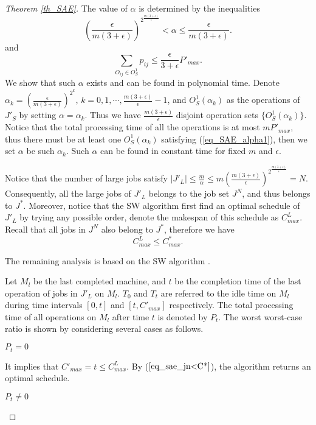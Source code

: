 \documentclass{llncs}
\newcommand{\be}{\begin{equation}}
\newcommand{\ee}{\end{equation}}
\numberwithin{subcase}{case}
\begin{document}
\begin{proof}[Theorem \ref{th_SAE}]
The value of $\alpha$ is determined by the inequalities
\be
\left(\frac{\epsilon}{m(3+\epsilon)}\right)^{2^{\frac{m(3+\epsilon)}{\epsilon}}} < \alpha \leq \frac{\epsilon}{m(3+\epsilon)}. \label{eq_SAE_alpha2}
\ee
and
\be
\sum_{O_{ij}\in O^1_S} p_{ij} \leq \frac{\epsilon}{3 + \epsilon} P'_{max}. \label{eq_SAE_alpha1}
\ee
We show that such $\alpha$ exists and can be found in polynomial time. Denote $\alpha_k = \left(\frac{\epsilon}{m(3+\epsilon)}\right)^{2^{k}}$, $k = 0, 1, \cdots, \frac{m(3+\epsilon)}{\epsilon}-1$, and $O^1_S(\alpha_k)$ as the operations of $J'_S$ by setting $\alpha = \alpha_k$. Thus we have $\frac{m(3+\epsilon)}{\epsilon}$ disjoint operation sets $\{O^1_S(\alpha_k)\}$. Notice that the total processing time of all the operations is at most $mP'_{max}$, thus there must be at least one $O^1_S(\alpha_k)$ satisfying (\ref{eq_SAE_alpha1}), then we set $\alpha$ be such $\alpha_k$. Such $\alpha$ can be found in constant time for fixed $m$ and $\epsilon$.

Notice that the number of large jobs satisfy $|J'_L| \leq \frac{m}{\alpha} \leq m\left(\frac{m(3+\epsilon)}{\epsilon}\right)^{2^{\frac{m(3+\epsilon)}{\epsilon}}}  = N$. Consequently, all the large jobs of $J'_L$ belongs to the job set $J^N$, and thus belongs to $J^*$. Moreover, notice that the SW algorithm first find an optimal schedule of $J'_L$ by trying any possible order, denote the makespan of this schedule as $C^L_{max}$. Recall that all jobs in $J^N$ also belong to $J^*$, therefore we have
\be
C^L_{max} \leq C^*_{max}. \label{eq_sae_jn<C*}
\ee

The remaining analysis is based on the SW algorithm \cite{Sevastianov1998}.

Let $M_l$ be the last completed machine, and $t$ be the completion time of the last operation of jobs in $J'_L$ on $M_l$. $T_0$ and $T_t$ are referred to the idle time on $M_l$ during time intervals $[0, t]$ and $[t, C'_{max}]$ respectively. The total processing time of all operations on $M_l$ after time $t$ is denoted by $P_t$. The worst worst-case ratio is shown by considering several cases as follows.

\setcounter{case}{0}
\begin{case}{$P_t = 0$}

It implies that $C'_{max} = t \leq C^L_{max}$. By ($\ref{eq_sae_jn<C*}$), the algorithm returns an optimal schedule.
\end{case}

\begin{case}{$P_t \neq 0$}


\end{case}
\end{proof}
\end{document}
